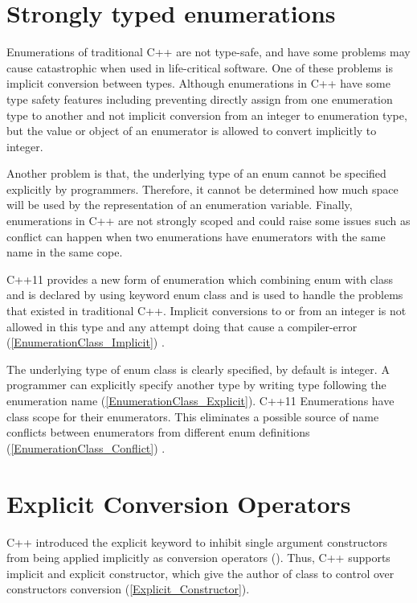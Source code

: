 \documentclass[11pt]{report}
\begin{document}
\section{Strongly typed enumerations}
\label{section: Strongly typed enumerations}
Enumerations of traditional C++ are not type-safe, and have some problems may cause catastrophic when used in life-critical software. One of these problems is implicit conversion between types. Although enumerations in C++ have some type safety features including preventing directly assign from one enumeration type to another and not implicit conversion from an integer to enumeration type, but the value or object of an enumerator is allowed to convert implicitly to integer.


Another problem is that, the underlying type of an enum cannot be specified explicitly by programmers. Therefore, it cannot be determined how much space will be used by the representation of an enumeration variable. Finally, enumerations in C++ are not strongly scoped and could raise some issues such as conflict can happen when two enumerations have enumerators with the same name in the same cope\cite{Stroustrup:2012:Cpp11}.


C++11 provides a new form of enumeration which combining enum with class and is declared by using keyword enum class and is used to handle the problems that existed in traditional C++.  Implicit conversions to or from an integer is not allowed in this type and any attempt doing that cause a compiler-error (\ref{EnumerationClass_Implicit}) \cite{Overland:2011:CWF}.


The underlying type of enum class is clearly specified, by default is integer.  A programmer can explicitly specify another type by writing type following the enumeration name (\ref{EnumerationClass_Explicit}). C++11 Enumerations have class scope for their enumerators. This eliminates a possible source of name conflicts between enumerators from different enum definitions (\ref{EnumerationClass_Conflict}) \cite{Josuttis:2012:CppStandardLibrary}.


\section{Explicit Conversion Operators}
\label{section: Explicit Conversion Operators}
C++ introduced the explicit keyword to inhibit single argument constructors from being applied implicitly as conversion operators (\cite{Gregorie:professionalcpp}). Thus, C++ supports implicit and explicit constructor, which give the author of class to control over constructors conversion (\ref{Explicit_Constructor}).
\end{document}
